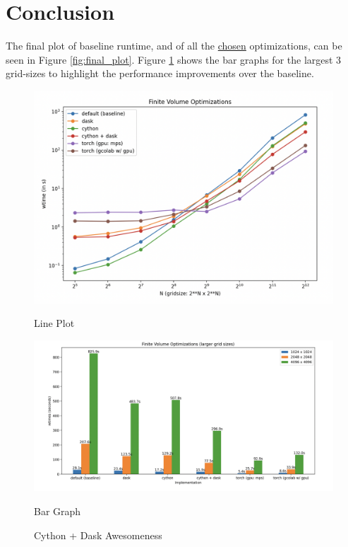 \documentclass[a4paper,10pt]{article}
\begin{document}
\section{Conclusion}
The final plot of baseline runtime, and of all the \underline{chosen} optimizations, can be seen in Figure \ref{fig:final_plot}. Figure \ref{fig:final_bar} shows the bar graphs for the largest 3 grid-sizes to highlight the performance improvements over the baseline. 

 \begin{figure}[h!]
    \begin{minipage}{0.5\textwidth}
        \centering
        \includegraphics[width=\linewidth]{images/final/final_plot.png}
       \caption{Line Plot}
        \label{fig:final_plot}
    \end{minipage}
    \hspace{0.1cm}
    \begin{minipage}{0.5\textwidth}
        \centering
        \includegraphics[width=\linewidth]{images/final/final_bar.png}
       \caption{Bar Graph}
       \label{fig:final_bar}
   \end{minipage}
   \caption{Cython + Dask Awesomeness}
 \end{figure}
\end{document}
